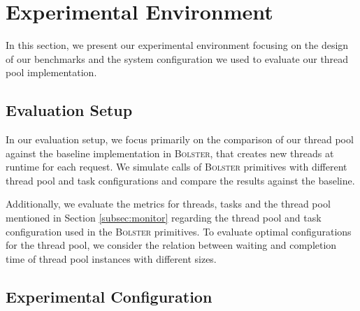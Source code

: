 \documentclass[conference]{IEEEtran}
\begin{document}
\section{Experimental Environment}
In this section, we present our experimental environment focusing on the design of our benchmarks and the system configuration we used to evaluate our thread pool implementation.

\subsection{Evaluation Setup}
In our evaluation setup, we focus primarily on the comparison of our thread pool against the baseline implementation in \textsc{Bolster}, that creates new threads at runtime for each request. We simulate calls of \textsc{Bolster} primitives with different thread pool and task configurations and compare the results against the baseline.

Additionally, we evaluate the metrics for threads, tasks and the thread pool mentioned in Section \ref{subsec:monitor} regarding the thread pool and task configuration used in the \textsc{Bolster} primitives. To evaluate optimal configurations for the thread pool, we consider the relation between waiting and completion time of thread pool instances with different sizes.


\subsection{Experimental Configuration}
\end{document}
